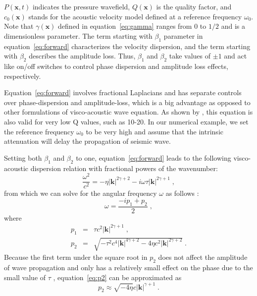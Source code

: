 $P(\mathbf{x}, t)$ indicates the pressure wavefield, $Q(\mathbf{x})$ is the quality factor, and $c_0(\mathbf{x})$ stands for the acoustic velocity model defined at a reference frequency $\omega_0$.
Note that $\gamma(\mathbf{x})$ defined in equation~\ref{eq:gamma} ranges from $0$ to $1/2$ and is a dimensionless parameter.
The term starting with $\beta_1$ parameter in equation~\ref{eq:forward} characterizes the velocity dispersion,
and the term starting with $\beta_2$ describes the amplitude loss.
Thus, $\beta_1$ and $\beta_2$ take values of $\pm1$ and
act like on/off switches to control phase dispersion and amplitude loss effects, respectively.

Equation~\ref{eq:forward} involves fractional Laplacians and has separate controls over phase-dispersion and amplitude-loss, which is a big advantage as opposed to other formulations of visco-acoustic wave equation.
As shown by \cite{zhu14}, this equation is also valid for very low Q values, such as 10-20.
In our numerical example, we set the reference frequency $\omega_0$ to be very high and assume that the intrinsic attenuation will delay the propagation of seismic wave.

Setting both $\beta_1$ and $\beta_2$ to one, equation~\ref{eq:forward} leads to the following visco-acoustic dispersion relation with fractional
powers of the wavenumber:
\begin{equation}
	\label{eq:relation}
	\frac{\omega^2}{c^2}=-\eta|\mathbf{k}|^{2\gamma+2} -i\omega\tau|\mathbf{k}|^{2\gamma+1} \; ,
\end{equation}
from which we can solve for the angular frequency $\omega$ as follows \cite[]{sun15}:
\begin{equation}
	\label{eq:omega}
	\omega=\frac{-ip_1 +p_2}{2} \; ,
\end{equation}
where
\begin{eqnarray}
	\label{eq:p1}
	p_1 & = & \tau c^2 |\mathbf{k}|^{2\gamma+1} \; , \\
	\label{eq:p2}
	p_2 & = & \sqrt{-\tau^2 c^4 |\mathbf{k}|^{4\gamma+2} - 4\eta c^2 |\mathbf{k}|^{2\gamma+2}} \; .
\end{eqnarray}
Because the first term under the square root in $p_2$ does not affect the amplitude of wave propagation and only has a relatively small effect on the phase due to the small value of $\tau$ \cite[]{sun15},
equation~\ref{eq:p2} can be approximated as
\begin{equation}
	\label{eq:p22}
	p_2 \approx \sqrt{- 4\eta} c |\mathbf{k}|^{\gamma+1} \; .
\end{equation}

